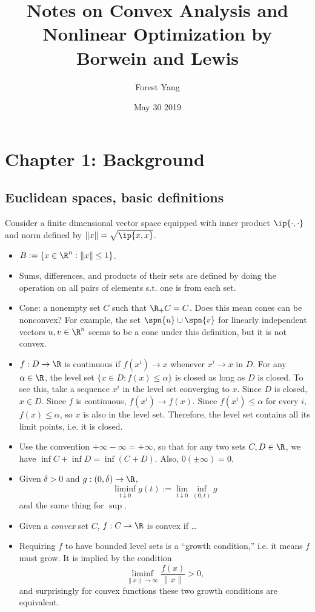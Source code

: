 \documentclass[12pt, letterpaper]{article}
\title{\textbf{Notes on Convex Analysis and Nonlinear Optimization
by Borwein and Lewis}}
\author{Forest Yang }
\date{May 30 2019}
\numberwithin{equation}{subsection}
\begin{document}
\maketitle
\section{Chapter 1: Background}
\subsection{Euclidean spaces, basic definitions}
Consider a finite dimensional vector space equipped with inner product 
$\ip{\cdot,\cdot}$ and norm defined by $\|x\|=\sqrt{\ip{x,x}}$.
\begin{itemize}
\item $B:= \{x\in\R^n : \|x\|\leq 1\}$.
\item Sums, differences, and products of their sets are defined by 
doing the operation on all pairs of elements s.t. one is from each set.
\item Cone: a nonempty set $C$ such that $\R_+C=C$. Does this mean 
cones can be nonconvex? For example, the set $\spn\{u\}\cup
\spn\{ v\}$
for linearly independent vectors $u,v\in\R^n$ seems to be a cone 
under this definition, but it is not convex.
\item $f:D\to\R$ is continuous if $f(x^i)\to x$ whenever $x^i\to x$ in 
$D$. For any $\alpha\in\R$, the level set $\{x\in D: f(x)\leq \alpha\}$
is closed as long as $D$ is closed. To see this, take a sequence 
$x^i$ in the level set converging to $x$. Since $D$ is closed, $x\in D$. 
Since $f$ is continuous, $f(x^i)\to f(x)$. Since $f(x^i)\leq \alpha$ 
for every $i$, $f(x)\leq \alpha$, so $x$ is also in the level set.
Therefore, the level set contains all its limit points, i.e. it is closed.
\item Use the convention $+\infty-\infty=+\infty$, so that for any two 
sets $C,D\in\R$, we have $\inf C + \inf D = \inf(C+D)$. Also, 
$0(\pm\infty)=0$.
\item Given $\delta>0$ and $g:(0,\delta)\to\R$, 
\begin{equation*}
\liminf_{t\downarrow 0}g(t) := \lim_{t\downarrow 0}\inf_{(0, t)} g
\end{equation*}
and the same thing for $\sup$.
\item Given a \textit{convex} set $C$, $f:C\to\R$ is convex if \ldots
\item Requiring $f$ to have bounded level sets is a ``growth condition,''
i.e. it means $f$ must grow. It is implied by the condition
\begin{equation*}
\liminf_{\|x\|\to\infty} \frac{f(x)}{\|x\|} > 0,
\end{equation*}
and surprisingly for convex functions these two growth conditions are 
equivalent.
\end{itemize}
\end{document}
